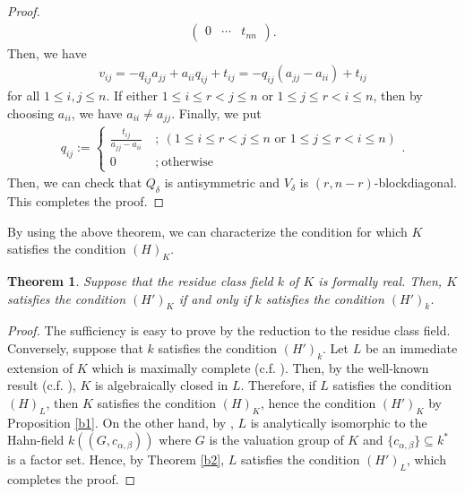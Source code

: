 \documentclass[12pt]{amsart}
\theoremstyle{plain}
\newtheorem{thm}[prop] {Theorem}
\theoremstyle{definition}
\begin{document}
\begin{proof}
\begin{align*}
\begin{pmatrix}
      0 & \cdots & t_{nn}
    \end{pmatrix}.
    \end{align*}
    Then, we have 
    \begin{align*}
      v_{ij} = -q_{ij} a_{jj} +a_{ii}q_{ij} + t_{ij} = -q_{ij}(a_{jj} - a_{ii}) + t_{ij}
    \end{align*}
    for all $1 \le i,j \le n$. If either $1 \le i \le r < j \le n$ or $1 \le j \le r < i \le n$, then by choosing $a_{ii}$, we have $a_{ii} \neq a_{jj}$. Finally, we put 
    \begin{align*}
      q_{ij} := \left\{
      \begin{aligned}
        \frac{t_{ij}}{a_{jj}-a_{ii}} \ &; \ (\text{$1 \le i \le r < j \le n$ or $1 \le j \le r < i \le n$}) \\
        0 \ &; \ \text{otherwise}
      \end{aligned}
      \right. .
    \end{align*}
    Then, we can check that $Q_{\delta}$ is antisymmetric and $V_{\delta}$ is $(r,n-r)$-blockdiagonal. This completes the proof.
\end{proof}

By using the above theorem, we can characterize the condition for which $K$ satisfies the condition $(H)_K$. 
  
\begin{thm}
  Suppose that the residue class field $k$ of $K$ is formally real. Then, $K$ satisfies the condition $(H')_K$ if and only if $k$ satisfies the condition $(H')_k$.
\end{thm}
  \begin{proof}
    The sufficiency is easy to prove by the reduction to the residue class field. Conversely, suppose that $k$ satisfies the condition $(H')_k$. Let $L$ be an immediate extension of $K$ which is maximally complete (c.f. \cite[Theorem 4.49]{van}). Then, by the well-known result (c.f. \cite[Chapter 3, Corollary to Theorem 10]{artin}), $K$ is algebraically closed in $L$. Therefore, if $L$ satisfies the condition $(H)_{L}$, then $K$ satisfies the condition $(H)_K$, hence the condition $(H')_K$ by Proposition \ref{b1}. On the other hand, by \cite[Theorem 6]{kap}, $L$ is analytically isomorphic to the Hahn-field $k((G,c_{\alpha, \beta}))$ where $G$ is the valuation group of $K$ and $\{c_{\alpha, \beta}\} \subseteq k^*$ is a factor set. Hence, by Theorem \ref{b2}, $L$ satisfies the condition $(H')_L$, which completes the proof.
\end{proof}
\end{document}

